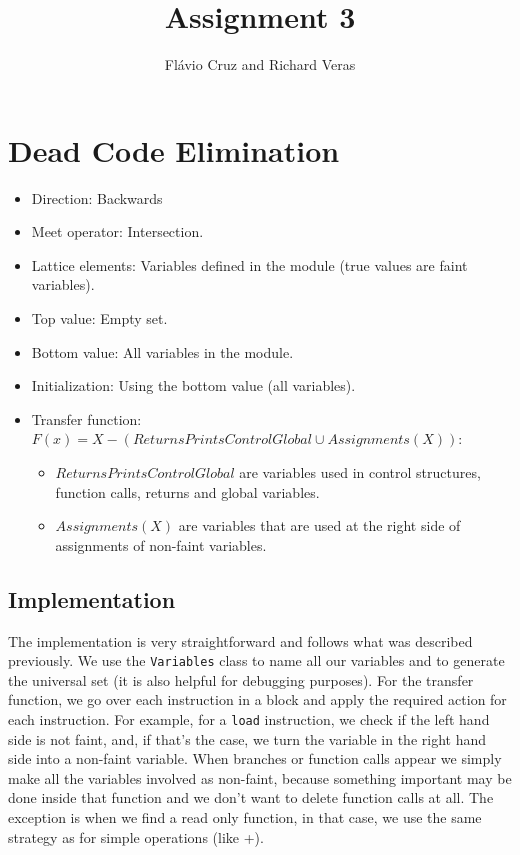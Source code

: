 \documentclass[12pt]{article}
\author{Fl\'{a}vio Cruz and Richard Veras}
\title{Assignment 3}
\begin{document}
\maketitle

\section{Dead Code Elimination}

\begin{itemize}
   \item Direction: Backwards
   \item Meet operator: Intersection.
   \item Lattice elements: Variables defined in the module (true values are faint variables).
   \item Top value: Empty set.
   \item Bottom value: All variables in the module.
   \item Initialization: Using the bottom value (all variables).
   \item Transfer function: $F(x) = X - (ReturnsPrintsControlGlobal \cup Assignments(X))$:
  \begin{itemize}
   \item $ReturnsPrintsControlGlobal$ are variables used in control structures, function calls, returns and global variables.
   \item $Assignments(X)$ are variables that are used at the right side of assignments of non-faint variables.
   \end{itemize}
\end{itemize}

\subsection{Implementation}

The implementation is very straightforward and follows what was described previously.
We use the \texttt{Variables} class to name all our variables and to generate the universal set (it is also helpful for debugging purposes). For the transfer function, we go over each instruction in a block and apply the required action for each instruction.
For example, for a \texttt{load} instruction, we check if the left hand side is not faint, and, if that's the case, we turn the variable in the right hand side into a non-faint variable. When branches or function calls appear we simply make all the variables involved as non-faint, because something important may be done inside that function and we don't want to delete function calls at all. The exception is when we find a read only function, in that case, we use the same strategy as for simple operations (like +).
\end{document}
